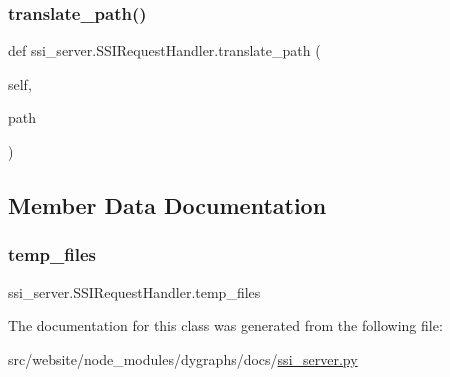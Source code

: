 \subsubsection{\texorpdfstring{translate\+\_\+path()}{translate\_path()}}
{\footnotesize\ttfamily def ssi\+\_\+server.\+S\+S\+I\+Request\+Handler.\+translate\+\_\+path (\begin{DoxyParamCaption}\item[{}]{self,  }\item[{}]{path }\end{DoxyParamCaption})}



\subsection{Member Data Documentation}
\mbox{\label{classssi__server_1_1SSIRequestHandler_afb75305b5cb2a913599b40810aeeeb68}} 
\subsubsection{\texorpdfstring{temp\+\_\+files}{temp\_files}}
{\footnotesize\ttfamily ssi\+\_\+server.\+S\+S\+I\+Request\+Handler.\+temp\+\_\+files}



The documentation for this class was generated from the following file\+:\begin{DoxyCompactItemize}
\item 
src/website/node\+\_\+modules/dygraphs/docs/\hyperlink{ssi__server_8py}{ssi\+\_\+server.\+py}\end{DoxyCompactItemize}

